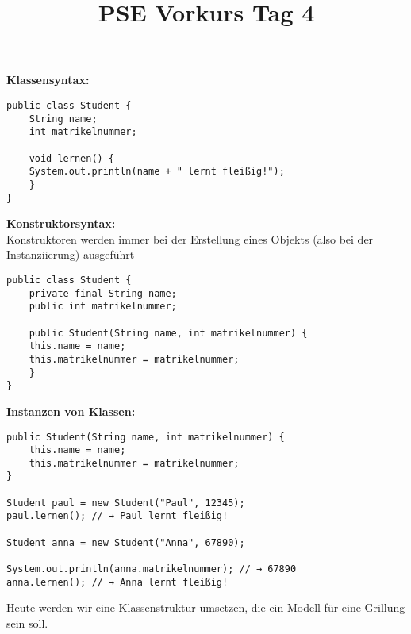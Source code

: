 \documentclass{../../sheet}
\title{PSE Vorkurs Tag 4}
\begin{document}
\maketitle

\textbf{Klassensyntax:}
	\begin{verbatim}
public class Student {
    String name;
    int matrikelnummer;

    void lernen() {
	System.out.println(name + " lernt fleißig!");
    }
}
\end{verbatim}

\textbf{Konstruktorsyntax:}\\
Konstruktoren werden immer bei der Erstellung eines Objekts (also bei der Instanziierung) ausgeführt
	\begin{verbatim}
public class Student {
    private final String name;
    public int matrikelnummer;

    public Student(String name, int matrikelnummer) {
	this.name = name;
	this.matrikelnummer = matrikelnummer;
    }
}
	\end{verbatim}

\textbf{Instanzen von Klassen:}
	
	\begin{verbatim}
public Student(String name, int matrikelnummer) {
    this.name = name;
    this.matrikelnummer = matrikelnummer;
}

Student paul = new Student("Paul", 12345);
paul.lernen(); // → Paul lernt fleißig!

Student anna = new Student("Anna", 67890);

System.out.println(anna.matrikelnummer); // → 67890
anna.lernen(); // → Anna lernt fleißig!

	\end{verbatim}
	


\newpage

Heute werden wir eine Klassenstruktur umsetzen, die ein Modell für eine Grillung sein soll.
\end{document}
